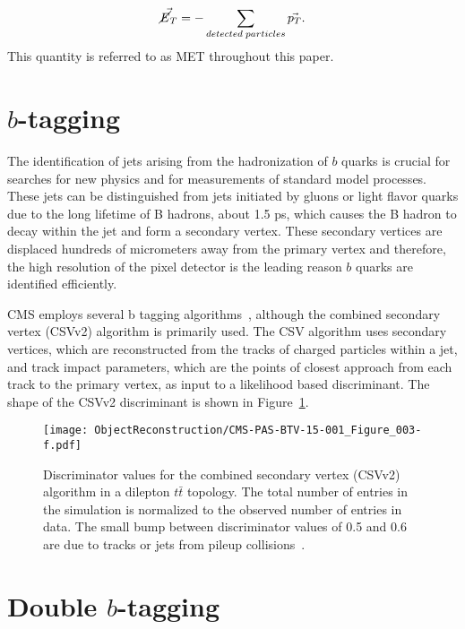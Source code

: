 \begin{equation}
\vec{\cancel{E}_{T}}= -\sum_{detected\;particles} \vec{p_{T}}.
\end{equation}
This quantity is referred to as MET throughout this paper.

\section{$b$-tagging}

The identification of jets arising from the hadronization of $b$ quarks is crucial for searches for new physics and for measurements of standard model processes. These jets can be distinguished from jets initiated by gluons or light flavor quarks due to the long lifetime of B hadrons, about 1.5 ps, which causes the B hadron to decay within the jet and form a secondary vertex. These secondary vertices are displaced hundreds of micrometers away from the primary vertex and therefore, the high resolution of the pixel detector is the leading reason $b$ quarks are identified efficiently.

CMS employs several b tagging algorithms~\cite{BTagging}, although the combined secondary vertex (CSVv2) algorithm is primarily used. The CSV algorithm uses secondary vertices, which are reconstructed from the tracks of charged particles within a jet, and track impact parameters, which are the points of closest approach from each track to the primary vertex, as input to a likelihood based discriminant. The shape of the CSVv2 discriminant is shown in Figure~\ref{fig:CSV}.

\begin{figure}[h!]
\begin{center}
\texttt{[image: ObjectReconstruction/CMS-PAS-BTV-15-001\_Figure\_003-f.pdf]}
\end{center}
\caption{Discriminator values for the combined secondary vertex (CSVv2) algorithm in a dilepton $t\bar{t}$ topology. The total number of entries in the simulation is normalized to the observed number of entries in data. The small bump between discriminator values of 0.5 and 0.6 are due to tracks or jets from pileup collisions~\cite{BTagging}.}
\label{fig:CSV}
\end{figure}


\section{Double $b$-tagging}

